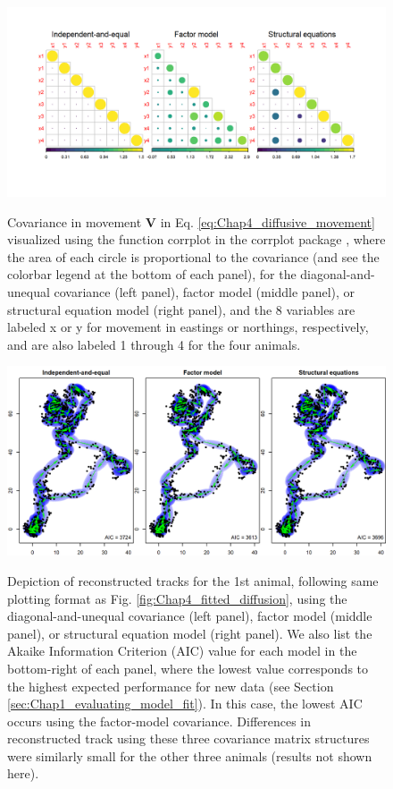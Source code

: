 \begin{figure}[!ht]
    \caption[Estimated covariance in movement using alternative correlation methods]{Covariance in movement \(\mathbf{V}\) in Eq. \ref{eq:Chap4_diffusive_movement} visualized using the function \colorbox{backcolour}{corrplot} in the \colorbox{backcolour}{corrplot} package \cite{wei_r_2021}, where the area of each circle is proportional to the covariance (and see the colorbar legend at the bottom of each panel), for the diagonal-and-unequal covariance (left panel), factor model (middle panel), or structural equation model (right panel), and the 8 variables are labeled x or y for movement in eastings or northings, respectively, and are also labeled 1 through 4 for the four animals.}
    \centering
    \includegraphics[width=5.5in]{Chap_4/fitted_joint-covariance.png}
    \label{fig:Chap4_joint_covariance}
\end{figure}

\begin{figure}[!ht]
    \caption[Reconstructed tracks using alternative correlation methods]{Depiction of reconstructed tracks for the 1st animal, following same plotting format as Fig. \ref{fig:Chap4_fitted_diffusion}, using the diagonal-and-unequal covariance (left panel), factor model (middle panel), or structural equation model (right panel).  We also list the Akaike Information Criterion (AIC) value for each model in the bottom-right of each panel, where the lowest value corresponds to the highest expected performance for new data (see Section \ref{sec:Chap1_evaluating_model_fit}).  In this case, the lowest AIC occurs using the factor-model covariance.  Differences in reconstructed track using these three covariance matrix structures were similarly small for the other three animals (results not shown here).}
    \includegraphics[width=5.5in]{Chap_4/fitted_joint-tracks.png}
    \label{fig:Chap4_joint_tracks}
\end{figure}

